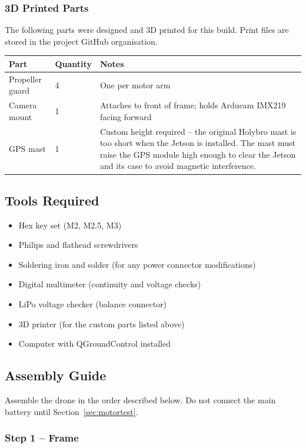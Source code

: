 \documentclass{article}
\begin{document}
\subsubsection{3D Printed Parts}

The following parts were designed and 3D printed for this build. Print files are stored in the project GitHub organisation.

\begin{tabular}{p{4cm}p{3.5cm}p{6cm}}
\toprule
\textbf{Part} & \textbf{Quantity} & \textbf{Notes} \\
\midrule
Propeller guard & 4 & One per motor arm \\
Camera mount & 1 & Attaches to front of frame; holds Arducam IMX219 facing forward \\
GPS mast & 1 & Custom height required -- the original Holybro mast is too short when the Jetson is installed. The mast must raise the GPS module high enough to clear the Jetson and its case to avoid magnetic interference. \\
\bottomrule
\end{tabular}

\subsection{Tools Required}

\begin{itemize}
    \item Hex key set (M2, M2.5, M3)
    \item Philips and flathead screwdrivers
    \item Soldering iron and solder (for any power connector modifications)
    \item Digital multimeter (continuity and voltage checks)
    \item LiPo voltage checker (balance connector)
    \item 3D printer (for the custom parts listed above)
    \item Computer with QGroundControl installed
\end{itemize}

\subsection{Assembly Guide}

Assemble the drone in the order described below. Do not connect the main battery until Section~\ref{sec:motortest}.

\subsubsection{Step 1 -- Frame}
\end{document}
